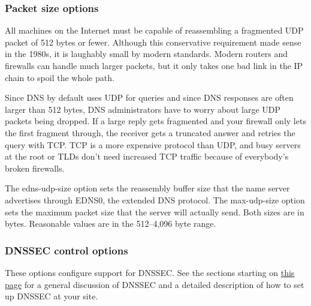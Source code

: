 \subsubsection[Packet size options]{\texorpdfstring{Packet size
options\protect\hypertarget{part0024_split_037.htmlux5cux23_idIndexMarker2154}{}{}}{Packet size options}}


All machines on the
\protect\hypertarget{part0024_split_037.htmlux5cux23_idIndexMarker2155}{}{}Internet
must be capable of reassembling a fragmented UDP packet of 512 bytes or
fewer. Although this conservative requirement made sense in the 1980s,
it is laughably small by modern standards. Modern routers and firewalls
can handle much larger packets, but it only takes one bad link in the IP
chain to spoil the whole path.

\protect\hypertarget{part0024_split_037.htmlux5cux23_idIndexMarker2156}{}{}Since
DNS by default uses UDP for queries and since DNS responses are often
larger than 512 bytes, DNS administrators have to worry about large UDP
packets being dropped. If a large reply gets fragmented and your
firewall only lets the first fragment through, the receiver gets a
truncated answer and retries the query with TCP. TCP is a more expensive
protocol than UDP, and busy servers at the root or TLDs don't need
increased TCP traffic because of everybody's broken firewalls.

The {edns-udp-size} option sets the reassembly buffer size that the name
server advertises through
\protect\hypertarget{part0024_split_037.htmlux5cux23_idIndexMarker2157}{}{}EDNS0,
the extended DNS protocol. The {max-udp-size} option sets the maximum
packet size that the server will actually send. Both sizes are in bytes.
Reasonable values are in the 512--4,096 byte range.

\subsubsection[DNSSEC control options]{\texorpdfstring{DNSSEC control
options\protect\hypertarget{part0024_split_037.htmlux5cux23_idIndexMarker2158}{}{}\protect\hypertarget{part0024_split_037.htmlux5cux23_idIndexMarker2159}{}{}\protect\hypertarget{part0024_split_037.htmlux5cux23_idIndexMarker2160}{}{}}{DNSSEC control options}}


These options configure support for DNSSEC. See the sections starting on
\protect\hyperlink{part0024_split_059.htmlux5cux23_idTextAnchor938}{this
page} for a general discussion of DNSSEC and a detailed description of
how to set up DNSSEC at your site.

